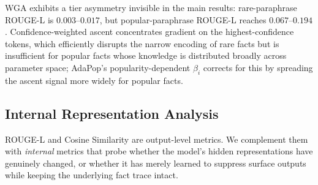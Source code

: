 WGA exhibits a tier asymmetry invisible in the main results: rare-paraphrase ROUGE-L is $0.003$--$0.017$, but popular-paraphrase ROUGE-L reaches $0.067$--$0.194$. Confidence-weighted ascent concentrates gradient on the highest-confidence tokens, which efficiently disrupts the narrow encoding of rare facts but is insufficient for popular facts whose knowledge is distributed broadly across parameter space; AdaPop's popularity-dependent $\beta_i$ corrects for this by spreading the ascent signal more widely for popular facts.

\subsection{Internal Representation Analysis}
\label{sec:internal}

ROUGE-L and Cosine Similarity are output-level metrics. We complement them with \emph{internal} metrics that probe whether the model's hidden representations have genuinely changed, or whether it has merely learned to suppress surface outputs while keeping the underlying fact trace intact.



